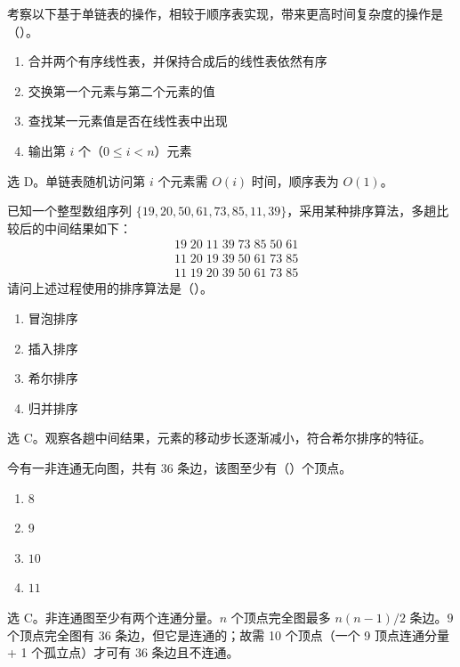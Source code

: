 \begin{question}
考察以下基于单链表的操作，相较于顺序表实现，带来更高时间复杂度的操作是（\quad）。
\begin{enumerate}
  \item 合并两个有序线性表，并保持合成后的线性表依然有序
  \item 交换第一个元素与第二个元素的值
  \item 查找某一元素值是否在线性表中出现
  \item 输出第 $i$ 个（$0\le i<n$）元素
\end{enumerate}
\begin{solution}
选 D。单链表随机访问第 $i$ 个元素需 $O(i)$ 时间，顺序表为 $O(1)$。
\end{solution}
\end{question}

\begin{question}
已知一个整型数组序列 $\{19,20,50,61,73,85,11,39\}$，采用某种排序算法，多趟比较后的中间结果如下：
\begin{align*}
&19\;20\;11\;39\;73\;85\;50\;61\\
&11\;20\;19\;39\;50\;61\;73\;85\\
&11\;19\;20\;39\;50\;61\;73\;85
\end{align*}
请问上述过程使用的排序算法是（\quad）。
\begin{enumerate}
  \item 冒泡排序
  \item 插入排序
  \item 希尔排序
  \item 归并排序
\end{enumerate}
\begin{solution}
选 C。观察各趟中间结果，元素的移动步长逐渐减小，符合希尔排序的特征。
\end{solution}
\end{question}

\begin{question}
今有一非连通无向图，共有 36 条边，该图至少有（\quad）个顶点。
\begin{enumerate}
  \item $8$
  \item $9$
  \item $10$
  \item $11$
\end{enumerate}
\begin{solution}
选 C。非连通图至少有两个连通分量。$n$ 个顶点完全图最多 $n(n-1)/2$ 条边。$9$ 个顶点完全图有 36 条边，但它是连通的；故需 10 个顶点（一个 9 顶点连通分量 + 1 个孤立点）才可有 36 条边且不连通。
\end{solution}
\end{question}


